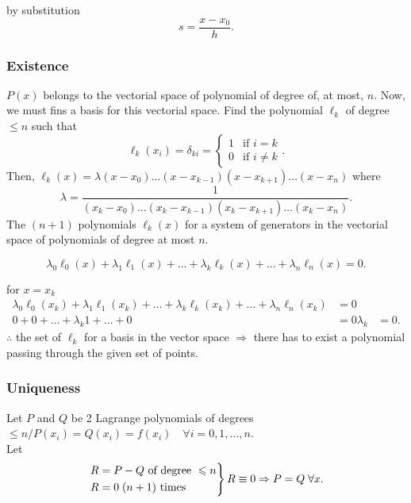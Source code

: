 \documentclass{report}
\begin{document}
by substitution
\[
	s = \frac{x-x_0}{h}
	.\]

\subsubsection{Existence}

\begin{myproof}
	$P(x)$ belongs to the vectorial space of polynomial of degree of, at most, $n$. Now, we must fins a basis for this vectorial space. Find the polynomial $\ell_k$ of degree $\leq n$ such that
	\[
		\ell_k(x_i) = \delta_{ki} = \begin{cases}
			1 & \text{if }i=k     \\
			0 & \text{if }i\neq k
		\end{cases}
		.\]
	Then, $\ell_k(x) = \lambda(x-x_0)\dots(x-x_{k-1})(x-x_{k+1})\dots(x-x_n)$
	where
	\[
		\lambda = \frac{1}{(x_k-x_0)\dots(x_k-x_{k-1})(x_k-x_{k+1})\dots(x_k-x_n)}
		.\]
	The $(n+1)$ polynomials $\ell_k(x)$ for a system of generators in the vectorial space of polynomials of degree at most $n$.

	\[
		\lambda_0\ell_0(x) + \lambda_1\ell_1(x) + \dots + \lambda_k\ell_k(x) + \dots + \lambda_n\ell_n(x) = 0
		.\]

	for $x=x_k$
	\begin{align*}
		\lambda_0\ell_0(x_k) + \lambda_1\ell_1(x_k) + \dots + \lambda_k\ell_k(x_k) + \dots + \lambda_n\ell_n(x_k) & = 0 \\
		0+0+\dots+\lambda_k1+\dots+0                                                                              & =0
		\lambda_k                                                                                                 & = 0
		.\end{align*}
	$\therefore$ the set of $\ell_k$ for a basis in the vector space $\Rightarrow$ there has to exist a polynomial passing through the given set of points.

\end{myproof}


\subsubsection{Uniqueness}

\begin{myproof}
	Let $P$ and $Q$ be 2 Lagrange polynomials of degrees $\leq n\Big/P(x_i)=Q(x_i)=f(x_i)\quad\forall i = 0,1,\dots,n$.\\
	Let
	\[
		\begin{rcases}
			R=P-Q \text{ of degree }\leq n \\
			R=0 \; (n+1) \text{ times}
		\end{rcases}R\equiv0\Rightarrow P=Q\;\forall x
		.\]
\end{myproof}
\end{document}
